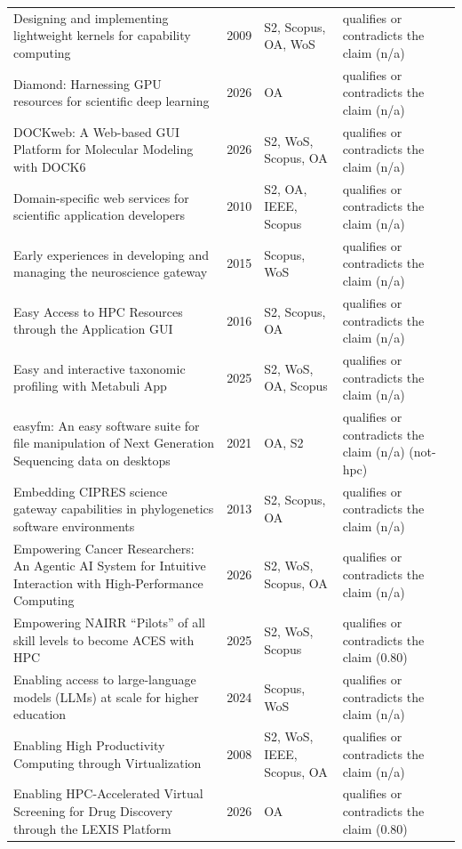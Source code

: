 \begin{longtable}{@{}%
  >{\raggedright\arraybackslash}p{}c%
  >{\raggedright\arraybackslash}p{}%
  >{\raggedright\arraybackslash}p{}@{}}
Designing and implementing lightweight kernels for capability computing & 2009 & S2, Scopus, OA, WoS & qualifies or contradicts the claim (n/a) \\
Diamond: Harnessing GPU resources for scientific deep learning & 2026 & OA & qualifies or contradicts the claim (n/a) \\
DOCKweb: A Web-based GUI Platform for Molecular Modeling with DOCK6 & 2026 & S2, WoS, Scopus, OA & qualifies or contradicts the claim (n/a) \\
Domain-specific web services for scientific application developers & 2010 & S2, OA, IEEE, Scopus & qualifies or contradicts the claim (n/a) \\
Early experiences in developing and managing the neuroscience gateway & 2015 & Scopus, WoS & qualifies or contradicts the claim (n/a) \\
Easy Access to HPC Resources through the Application GUI & 2016 & S2, Scopus, OA & qualifies or contradicts the claim (n/a) \\
Easy and interactive taxonomic profiling with Metabuli App & 2025 & S2, WoS, OA, Scopus & qualifies or contradicts the claim (n/a) \\
easyfm: An easy software suite for file manipulation of Next Generation Sequencing data on desktops & 2021 & OA, S2 & qualifies or contradicts the claim (n/a) (not-hpc) \\
Embedding CIPRES science gateway capabilities in phylogenetics software environments & 2013 & S2, Scopus, OA & qualifies or contradicts the claim (n/a) \\
Empowering Cancer Researchers: An Agentic AI System for Intuitive Interaction with High-Performance Computing & 2026 & S2, WoS, Scopus, OA & qualifies or contradicts the claim (n/a) \\
Empowering NAIRR ``Pilots'' of all skill levels to become \textquotedbl{}ACES\textquotedbl{} with HPC & 2025 & S2, WoS, Scopus & qualifies or contradicts the claim (0.80) \\
Enabling access to large-language models (LLMs) at scale for higher education & 2024 & Scopus, WoS & qualifies or contradicts the claim (n/a) \\
Enabling High Productivity Computing through Virtualization & 2008 & S2, WoS, IEEE, Scopus, OA & qualifies or contradicts the claim (n/a) \\
Enabling HPC-Accelerated Virtual Screening for Drug Discovery through the LEXIS Platform & 2026 & OA & qualifies or contradicts the claim (0.80) \\

\end{longtable}
